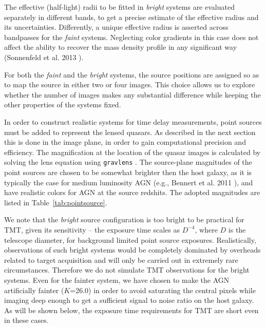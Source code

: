\documentclass[a4paper,11pt]{article}
\begin{document}
The effective (half-light) radii to be fitted in \textit{bright}
systems are evaluated separately in different bands, to get a precise
estimate of the effective radius and its uncertainties. Differently, a
unique effective radius is asserted across bandpasses for the
\textit{faint} systems. Neglecting color gradients in this case does
not affect the ability to recover the mass density profile in any
significant way
(Sonnenfeld et al. 2013 \cite{2013ApJ...777...97S}).

For both the \textit{faint} and the \textit{bright} systems, the source positions are
assigned so as to map the source in either two or four images. This
choice allows us to explore whether the number of images makes any
substantial difference while keeping the other properties of the
systems fixed.

In order to construct realistic systems for time delay measurements,
point sources must be added to represent the lensed quasars. As
described in the next section this is done in the image plane, in
order to gain computational precision and efficiency. The
magnification at the location of the quasar images is calculated by
solving the lens equation using \texttt{gravlens}
\cite{2011ascl.soft02003K}. The source-plane magnitudes of the point
sources are chosen to be somewhat brighter then the host galaxy, as it
is typically the case for medium luminosity AGN
(e.g., Bennert et al. 2011 \cite{2011ApJ...726...59B}), and have realistic colors for AGN at the
source redshits. The adopted magnitudes are listed in
Table~\ref{tab:pointsource}.

We note that the \textit{bright} source configuration is too bright to
be practical for TMT, given its sensitivity -- the exposure time
scales as $D^{-4}$, where $D$ is the telescope diameter, for
background limited point source exposures. Realistically, observations
of such bright systems would be completely dominated by overheads
related to target acquisition and will only be carried out in
extremely rare circumstances. Therefore we do not simulate TMT
observations for the bright systems. Even for the fainter system, we
have chosen to make the AGN artificially fainter
($K$=26.0) in order to avoid saturating the central pixels while
imaging deep enough to get a sufficient signal to noise ratio on the
host galaxy. As will be shown below, the exposure time requirements
for TMT are short even in these cases.
\end{document}
